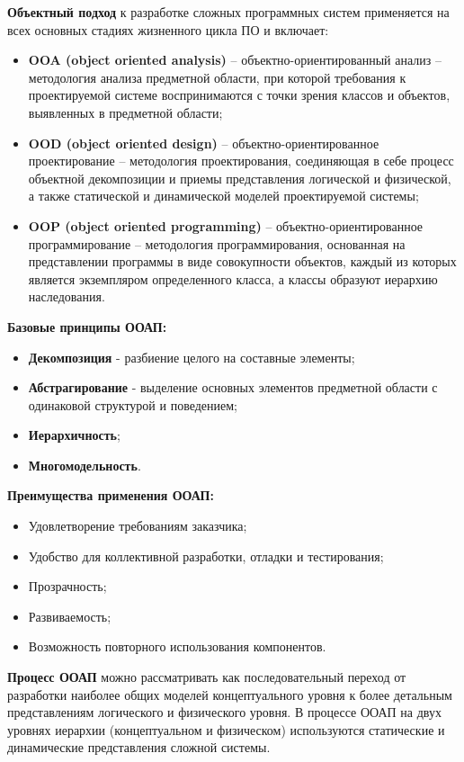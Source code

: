 \documentclass[a4paper, 12pt]{report}
\numberwithin{equation}{section}
\begin{document}
    \textbf{Объектный подход} к разработке сложных программных систем применяется на всех основных стадиях жизненного цикла ПО и включает:
    \begin{itemize}
        \item \textbf{OOA (object oriented analysis)} -- объектно-ориентированный анализ -- методология анализа предметной области, при которой требования к проектируемой системе воспринимаются с точки зрения классов и объектов, выявленных в предметной области;
        \item \textbf{OOD (object oriented design)} -- объектно-ориентированное проектирование -- методология проектирования, соединяющая в себе процесс объектной декомпозиции и приемы представления логической и физической, а также статической и динамической моделей проектируемой системы;
        \item \textbf{OOP (object oriented programming)} -- объектно-ориентированное программирование -- методология программирования, основанная на представлении программы в виде совокупности объектов, каждый из которых является экземпляром определенного класса, а классы образуют иерархию наследования.
    \end{itemize}
    \textbf{Базовые принципы ООАП:}
    \begin{itemize}
        \item \textbf{Декомпозиция} - разбиение целого на составные элементы;
        \item \textbf{Абстрагирование} - выделение основных элементов предметной области с одинаковой структурой и поведением;
        \item \textbf{Иерархичность};
        \item \textbf{Многомодельность}.
    \end{itemize}
    \textbf{Преимущества применения ООАП:}
    \begin{itemize}
        \item Удовлетворение требованиям заказчика;
        \item Удобство для коллективной разработки, отладки и тестирования;
        \item Прозрачность;
        \item Развиваемость;
        \item Возможность повторного использования компонентов.
    \end{itemize}
    \textbf{Процесс ООАП} можно рассматривать как последовательный переход от разработки наиболее общих моделей концептуального уровня к более детальным представлениям логического и физического уровня. В процессе ООАП на двух уровнях иерархии (концептуальном и физическом) используются статические и динамические представления сложной системы.
\end{document}
